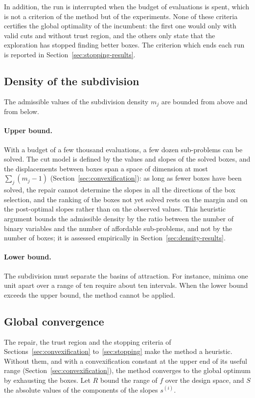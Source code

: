 \documentclass[pdflatex,sn-basic]{sn-jnl}
\begin{document}
In addition, the run is interrupted when the budget of evaluations is spent,
which is not a criterion of the method but of the experiments. None of these
criteria certifies the global optimality of the incumbent: the first one would
only with valid cuts and without trust region, and the others only state that
the exploration has stopped finding better boxes. The criterion which ends
each run is reported in Section~\ref{sec:stopping-results}.

\subsection{Density of the subdivision}\label{sec:density}

The admissible values of the subdivision density $m_j$ are bounded from above
and from below.

\paragraph{Upper bound.} With a budget of a few thousand evaluations, a few dozen
sub-problems can be solved. The cut model is defined by the values and slopes of
the solved boxes, and the displacements between boxes span a space of dimension
at most $\sum_j (m_j - 1)$ (Section~\ref{sec:convexification}): as long as fewer
boxes have been solved, the repair cannot determine the slopes in all the
directions of the box selection, and the ranking of the boxes not yet solved
rests on the margin and on the post-optimal slopes rather than on the observed
values. This heuristic argument bounds the admissible density by the ratio
between the number of binary variables and the number of affordable
sub-problems, and not by the number of boxes; it is assessed empirically in
Section~\ref{sec:density-results}.

\paragraph{Lower bound.} The subdivision must separate the basins of attraction.
For instance, minima one unit apart over a range of ten require about ten
intervals. When the lower bound exceeds the upper bound, the method cannot be
applied.

\subsection{Global convergence}\label{sec:convergence}

The repair, the trust region and the stopping criteria of
Sections~\ref{sec:convexification} to~\ref{sec:stopping} make the method a
heuristic. Without them, and with a convexification constant at the upper end
of its useful range (Section~\ref{sec:convexification}), the method converges
to the global optimum by exhausting the boxes. Let $R$ bound the range of $f$ over the design space,
and $S$ the absolute values of the components of the slopes $s^{(i)}$.
\end{document}
